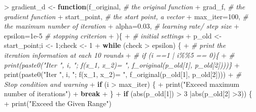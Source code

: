 \documentclass[
]{article}
\newenvironment{Shaded}{\begin{snugshade}}{\end{snugshade}}
\newcommand{\AttributeTok}[1]{\textcolor[rgb]{0.77,0.63,0.00}{#1}}
\newcommand{\CommentTok}[1]{\textcolor[rgb]{0.56,0.35,0.01}{\textit{#1}}}
\newcommand{\ControlFlowTok}[1]{\textcolor[rgb]{0.13,0.29,0.53}{\textbf{#1}}}
\newcommand{\DecValTok}[1]{\textcolor[rgb]{0.00,0.00,0.81}{#1}}
\newcommand{\FloatTok}[1]{\textcolor[rgb]{0.00,0.00,0.81}{#1}}
\newcommand{\FunctionTok}[1]{\textcolor[rgb]{0.00,0.00,0.00}{#1}}
\newcommand{\NormalTok}[1]{#1}
\newcommand{\OtherTok}[1]{\textcolor[rgb]{0.56,0.35,0.01}{#1}}
\newcommand{\SpecialCharTok}[1]{\textcolor[rgb]{0.00,0.00,0.00}{#1}}
\newcommand{\StringTok}[1]{\textcolor[rgb]{0.31,0.60,0.02}{#1}}
\begin{document}
\begin{Shaded}
\begin{Highlighting}[]
\SpecialCharTok{\textgreater{}}\NormalTok{ gradient\_d }\OtherTok{\textless{}{-}} \ControlFlowTok{function}\NormalTok{(f\_original, }\CommentTok{\# the original function}
\SpecialCharTok{+}\NormalTok{                        grad\_f, }\CommentTok{\# the gradient function}
\SpecialCharTok{+}\NormalTok{                        start\_point, }\CommentTok{\# the start point, a vector}
\SpecialCharTok{+}                        \AttributeTok{max\_iter=}\DecValTok{100}\NormalTok{, }\CommentTok{\# the maximum number of iteration}
\SpecialCharTok{+}                        \AttributeTok{alpha=}\FloatTok{0.03}\NormalTok{, }\CommentTok{\# learning rate/ step size}
\SpecialCharTok{+}                        \AttributeTok{epsilon=}\FloatTok{1e{-}5} \CommentTok{\# stopping criterion}
\SpecialCharTok{+}\NormalTok{ )\{}
\SpecialCharTok{+}   \CommentTok{\# initial settings}
\SpecialCharTok{+}\NormalTok{   p\_old }\OtherTok{\textless{}{-}}\NormalTok{ start\_point;i }\OtherTok{\textless{}{-}} \DecValTok{1}\NormalTok{;check }\OtherTok{\textless{}{-}} \DecValTok{1}
\SpecialCharTok{+}   \ControlFlowTok{while}\NormalTok{ (check }\SpecialCharTok{\textgreater{}}\NormalTok{ epsilon) \{}
\SpecialCharTok{+}     \CommentTok{\# print the iteration information at each 10 rounds}
\SpecialCharTok{+}     \CommentTok{\# if (i ==1 | i\%\%5 == 0)\{}
\SpecialCharTok{+}     \CommentTok{\#  print(paste0("Iter ", i, "; f(x\_1, x\_2)= ", f\_original(p\_old[1], p\_old[2])))\}}
\SpecialCharTok{+}     \FunctionTok{print}\NormalTok{(}\FunctionTok{paste0}\NormalTok{(}\StringTok{"Iter "}\NormalTok{, i, }\StringTok{"; f(x\_1, x\_2)= "}\NormalTok{, }\FunctionTok{f\_original}\NormalTok{(p\_old[}\DecValTok{1}\NormalTok{], p\_old[}\DecValTok{2}\NormalTok{])))}
\SpecialCharTok{+}     \CommentTok{\# Stop condition and warning}
\SpecialCharTok{+}     \ControlFlowTok{if}\NormalTok{ (i }\SpecialCharTok{\textgreater{}}\NormalTok{ max\_iter) \{}
\SpecialCharTok{+}       \FunctionTok{print}\NormalTok{(}\StringTok{"Exceed maximum number of iterations"}\NormalTok{)}
\SpecialCharTok{+}       \ControlFlowTok{break}
\SpecialCharTok{+}\NormalTok{       \}}
\SpecialCharTok{+}     \ControlFlowTok{if}\NormalTok{ (}\FunctionTok{abs}\NormalTok{(p\_old[}\DecValTok{1}\NormalTok{]) }\SpecialCharTok{\textgreater{}} \DecValTok{3} \SpecialCharTok{|}\FunctionTok{abs}\NormalTok{(p\_old[}\DecValTok{2}\NormalTok{] }\SpecialCharTok{\textgreater{}}\DecValTok{3}\NormalTok{)) \{}
\SpecialCharTok{+}       \FunctionTok{print}\NormalTok{(}\StringTok{"Exceed the Given Range"}\NormalTok{)}

\end{Highlighting}
\end{Shaded}
\end{document}
